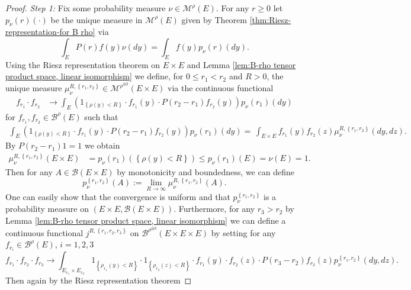 \documentclass[a4paper,12pt]{article}
\theoremstyle{definition}
\theoremstyle{remark}
\numberwithin{equation}{section}
\numberwithin{theorem}{section}
\begin{document}
\begin{proof}
\emph{Step 1:} Fix some probability measure  $\nu\in\mathcal{M}^{\rho}(E)$.
For any $r\geq0$ let $p_{\nu}(r)(\cdot)$ be the unique measure in $\mathcal{M}^{\rho}(E)$
given by Theorem  \ref{thm:Riesz-representation-for B rho}
via 
\[
\int_{E}P(r)f(y)\nu(dy)=\int_{E}f(y)p_{\nu}(r)(dy).
\]
Using the  Riesz representation theorem on $E\times E$ and Lemma \ref{lem:B-rho tensor product space, linear isomorphism} we define, for $0\leq r_{1}<r_{2}$ and $R >0$,  the unique measure $\mu_{\nu}^{R,\left\{ r_{1},r_{2}\right\} }\in\mathcal{M}^{\rho^{\otimes 2}}(E\times E)$
via the continuous functional  
\begin{align*}
f_{r_{1}}\cdot f_{r_{2}} & \rightarrow\int_{E}\left(1_{\left\{ \rho (y)<R\right\} }\cdot f_{r_{1}}(y)\cdot P(r_{2}-r_{1})f_{r_{2}}(y)\right)p_{\nu}(r_{1})(dy)
\end{align*}
for $f_{r_{1}}, f_{r_2} \in\mathscr{B}^{\rho}(E)$ 
such that
\begin{align*}
 \int_{E}\left(1_{\left\{ \rho(y)<R\right\} }\cdot f_{r_{1}}(y)\cdot P(r_{2}-r_{1})f_{r_{2}}(y)\right)p_{\nu}(r_{1})(dy)
 = \,\int_{E\times E}f_{r_{1}}(y)f_{r_{2}}(z)\mu_{\nu}^{R,\left\{ r_{1},r_{2}\right\} }(dy,dz).
\end{align*}
By $P(r_{2}-r_{1})1=1$ we obtain
\begin{align*}
\mu_{\nu}^{R,\left\{ r_{1},r_{2}\right\} }(E\times E) & =p_{\nu}(r_{1})\left(\left\{ \rho(y)<R\right\} \right)
  \leq p_{\nu}(r_{1})(E)
 = \nu(E)
 = 1.
\end{align*}
Then for any $A\in\mathcal{B}\left(E\times E\right)$
by monotonicity and boundedness, we can define
\[
p_{\nu}^{\left\{ r_{1},r_{2}\right\} }(A):=\underset{R\rightarrow\infty}{\lim}\mu_{\nu}^{R,\left\{ r_{1},r_{2}\right\} }(A).
\]
One can easily show that the convergence is uniform and that $p_{\nu}^{\left\{ r_{1},r_{2}\right\} }$
is a probability measure on
$
\left(E\times E,\mathcal{B}\left(E\times E\right)\right).
$
 Furthermore, for any $r_{3}>r_{2}$ by Lemma \ref{lem:B-rho tensor product space, linear isomorphism} we can define a continuous functional $j^{R,\left\{ r_{1},r_{2},r_{3}\right\}}$  on $\mathcal{\mathscr{B}}^{\rho^{\otimes 3}}(E\times E\times E)$  by setting for any $f_{r_{i}}\in \mathcal{\mathscr{B}}^{\rho}(E)$,  $i=1,2,3$
\[
f_{r_{1}}\cdot f_{r_{2}}\cdot f_{r_{3}}\rightarrow \int_{E_{r_{1}}\times E_{r_{2}}}1_{\left\{ \rho_{r_{1}}(y)<R\right\} }\cdot1_{\left\{ \rho_{r_{2}}(z)<R\right\} }\cdot f_{r_{1}}(y)\cdot f_{r_{2}}(z)\cdot P(r_{3}-r_{2})f_{r_{3}}(z)p_{\nu}^{\left\{ r_{1},r_{2}\right\} }(dy,dz).
\]
Then again by the Riesz representation theorem

\end{proof}
\end{document}
